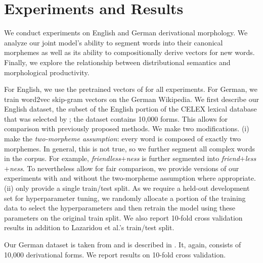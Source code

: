 \documentclass[11pt,letterpaper]{article}
\newcommand{\word}[1]{{\em #1}}
\begin{document}

\section{Experiments and Results}

We conduct experiments on English and German derivational
morphology. We analyze our joint model's ability to segment words into
their canonical morphemes as well as its ability to compositionally
derive vectors for new words. Finally, we explore the relationship
between distributional semantics and morphological productivity.

For English, we use the pretrained vectors of
 for all experiments. For German, we train
word2vec skip-gram vectors on the German Wikipedia. We first describe
our English dataset, the subset of the English portion of the CELEX
lexical database \cite{baayen1993celex} that was selected by
; the dataset contains 10,000 forms. This allows for comparison with previously
proposed methods.  We make two modifications.
(i)  make the \emph{two-morpheme assumption}: every
word is
composed of exactly two morphemes. In general, this is not true, so we
further segment all complex words in the corpus. For example,
\word{friendless}$+$\word{ness} is further segmented into
\word{friend}$+$\word{less}$+$\word{ness}. 
To nevertheless allow for
fair comparison, we provide versions of our experiments with and
without the two-morpheme assumption where
appropriate.
(ii)  only provide a single train/test split.
As we require a held-out development set for
hyperparameter tuning, we randomly allocate a portion of the training
data to select the hyperparameters and then retrain the model using
these parameters on the original train split. We also
report 10-fold cross validation results in addition to
Lazaridou et al.'s   train/test
split.

Our German dataset is taken from  and is
described in . It, again, consists
of 10,000 derivational forms. We report results on 10-fold
cross validation. 
\end{document}

